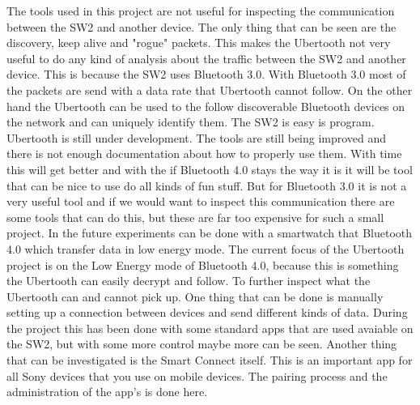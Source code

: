 The tools used in this project are not useful for inspecting the communication between the SW2 and another device. The only thing that can be seen are the discovery, keep alive and  "rogue" packets. This makes the Ubertooth not very useful to do any kind of analysis about the traffic between the SW2 and another device. This is because the SW2 uses Bluetooth 3.0. With Bluetooth 3.0  most of the packets are send with a data rate that Ubertooth cannot follow. \pend  On the other hand the Ubertooth can be used to the follow discoverable Bluetooth devices on the network and can uniquely identify them. The SW2 is easy is program. 
Ubertooth is still under development. The tools are still being improved and there is not enough documentation about how to properly use them. With time this will get better and with the if Bluetooth 4.0 stays the way it is it will be tool that can be nice to use do all kinds of fun stuff. But for Bluetooth 3.0 it is not a very useful tool and if we would want to inspect this communication there are some tools that can do this, but these are far too expensive for such a small project.
 \pend
In the future experiments can be done with a smartwatch that Bluetooth 4.0 which transfer data in low energy mode. The current focus of the Ubertooth project is on the Low Energy mode of Bluetooth 4.0, because this is something the Ubertooth can easily decrypt and follow. 
To further inspect what the Ubertooth can and cannot pick up. One thing that can be done is manually setting up a connection between devices and send different kinds of data. During the project this has been done with some standard apps that are used avaiable on the SW2, but with some more control maybe more can be seen. \pend
Another thing that can be investigated is the Smart Connect itself. This is an important app for all Sony devices that you use on mobile devices. The pairing process and the administration of the app's is done here. \pend
